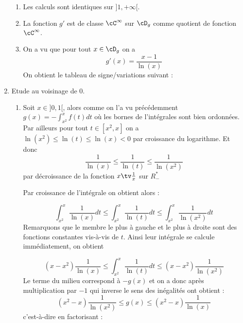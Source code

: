 \documentclass[a4paper, 11pt,reqno]{article}
\begin{document}
\begin{correction}
\begin{enumerate}
\begin{enumerate}
\item Les calculs sont identiques sur $]1,+\infty[$. 

\item La fonction $g'$ est de classe $\cC^\infty$ sur $\cD_g$ comme quotient de fonction $\cC^\infty$. 

\item On  a vu que pour tout $x\in \cD_g$ on a 
$$g'(x) = \frac{x-1}{\ln(x)}$$
On obtient le tableau de signe/variations suivant :






\end{enumerate}
\item Etude au voisinage de $0$. 
\begin{enumerate}
\item Soit $x\in ]0,1[$, alors comme on l'a vu précédemment 
$g(x)  = -\int_{x^2}^x f(t)dt$ où les bornes de l'intégrales sont bien ordonnées. 
Par ailleurs pour tout $t\in [x^2,x]$ on a $\ln(x^2)\leq \ln(t) \leq \ln(x)<0$ par croissance du logarithme. Et donc 
$$\frac{1}{\ln(x)}\leq \frac{1}{\ln(t)}\leq \frac{1}{\ln(x^2)}$$ par décroissance de la fonction $x\tv \frac{1}{x}$ sur $R^*_-$

Par croissance de l'intégrale on obtient alors : 

$$\int_{x^2}^x \frac{1}{\ln(x)}dt \leq \int_{x^2}^x \frac{1}{\ln(t)}dt\leq \int_{x^2}^x \frac{1}{\ln(x^2)}dt$$
Remarquons que le membre le plus à gauche et le plus à droite sont des fonctions constantes vis-à-vis de $t$. Ainsi leur intégrale se calcule immédiatement, on obtient  

$$(x-x^2) \frac{1}{\ln(x)} \leq  \int_{x^2}^x \frac{1}{\ln(t)}dt\leq (x-x^2)\frac{1}{\ln(x^2)}$$
Le terme du milieu correspond à $-g(x)$ et on a donc  après multiplication par $-1$
qui inverse le sens des inégalités ont obtient : 
$$ (x^2-x) \frac{1}{\ln(x^2)}\leq g(x)\leq (x^2-x) \frac{1}{\ln(x)}$$
c'est-à-dire en factorisant : 



\end{enumerate}
\end{enumerate}
\end{correction}
\end{document}
